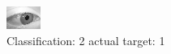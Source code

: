 \begin{figure}[h!]
\begin{center}
\includegraphics[width=0.60\columnwidth]{figures/ID2723_class_2_target_1.png}
\end{center}
\caption{ Classification: 2 actual target: 1}
\label{fig:ID2723_class_2_target_1}
\end{figure}
